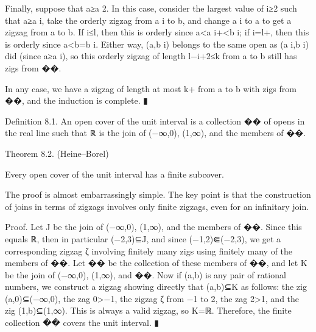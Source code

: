 Finally, suppose that a≥a 2. In this case, consider the largest value of i≥2 such that a≥a i, take the orderly zigzag from a i to b, and change a i to a to get a zigzag from a to b. If i≤l, then this is orderly since a<a i+<b i; if i=l+, then this is orderly since a<b=b i. Either way, (a,b i) belongs to the same open as (a i,b i) did (since a≥a i), so this orderly zigzag of length l−i+2≤k from a to b still has zigs from ��.

In any case, we have a zigzag of length at most k+ from a to b with zigs from ��, and the induction is complete.  ▮


Definition 8.1. An open cover of the unit interval is a collection �� of opens in the real line such that ℝ is the join of (−∞,0), (1,∞), and the members of ��.

Theorem 8.2. (Heine–Borel)

Every open cover of the unit interval has a finite subcover.

The proof is almost embarrassingly simple. The key point is that the construction of joins in terms of zigzags involves only finite zigzags, even for an infinitary join.

Proof. Let J be the join of (−∞,0), (1,∞), and the members of ��. Since this equals ℝ, then in particular (−2,3)⊆J, and since (−1,2)⋐(−2,3), we get a corresponding zigzag ζ involving finitely many zigs using finitely many of the members of ��. Let �� be the collection of these members of ��, and let K be the join of (−∞,0), (1,∞), and ��. Now if (a,b) is any pair of rational numbers, we construct a zigzag showing directly that (a,b)⊆K as follows: the zig (a,0)⊆(−∞,0), the zag 0>−1, the zigzag ζ from −1 to 2, the zag 2>1, and the zig (1,b)⊆(1,∞). This is always a valid zigzag, so K=ℝ. Therefore, the finite collection �� covers the unit interval.  ▮




\begin{lemma}
    
\end{lemma}